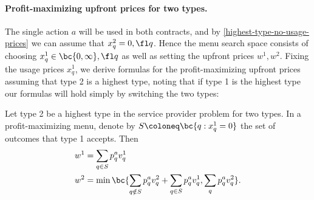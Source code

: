 \paragraph{Profit-maximizing upfront prices for two types.}

The single action $a$ will be used in both contracts, and by \cref{highest-type-no-usage-prices} we can assume that $x^2_q = 0,\fl q$. Hence the menu search space consists of choosing $x^1_q\in \bc{0,\infty},\fl q$ as well as setting the upfront prices $w^1, w^2$. Fixing the usage prices $x^1_q$, we derive formulas for the profit-maximizing upfront prices assuming that type 2 is a highest type, noting that if type 1 is the highest type our formulas will hold simply by switching the two types:

\begin{lemma} \label{upfront-price-formula-two-types}
    Let type 2 be a highest type in the service provider problem for two types. In a profit-maximizing menu, denote by $S \coloneq \bc{q:x^1_q = 0}$ the set of outcomes that type 1 accepts. Then
    \begin{align*}
        w^1 &= \sum_{q\in S} p^a_q v^1_q \\
        w^2 &= \min \bc{\sum_{q\notin S} p^a_q v^2_q + \sum_{q\in S} p^a_q v^1_q, \sum_q p^a_q v^2_q}.
    \end{align*}
\end{lemma}

        

        
